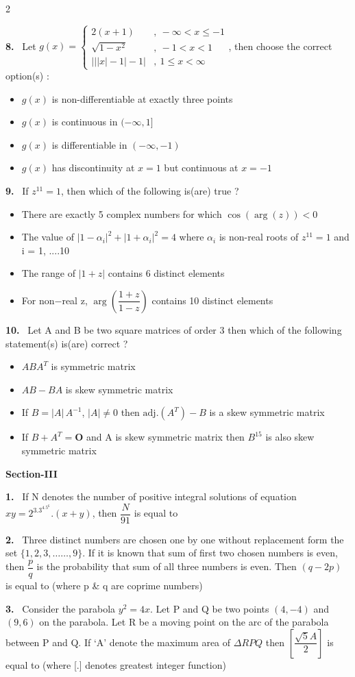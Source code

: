 \documentclass[10pt]{extarticle}
\newcommand{\sect}[1]{\par\smallskip\noindent\textbf{#1}\par}
\newcommand{\qn}[1]{\par\smallskip\noindent\textbf{#1.}~}
\newenvironment{qoptions}{\begin{itemize}[leftmargin=1.8em,itemsep=1pt,topsep=2pt,label={}]}{\end{itemize}}
\newcommand{\opt}[2]{\item[(#1)] #2}
\begin{document}
\begin{multicols}{2}
\qn{8} Let $g(x)=\begin{cases}2(x+1)&,\ -\infty<x\leqslant-1\\ \sqrt{1-x^2}&,\ -1<x<1\\ \big|\big||x|-1\big|-1\big|&,\ 1\leqslant x<\infty\end{cases}$, then choose the correct option(s) :
\begin{qoptions}
\opt{A}{$g(x)$ is non-differentiable at exactly three points}
\opt{B}{$g(x)$ is continuous in $(-\infty,1]$}
\opt{C}{$g(x)$ is differentiable in $(-\infty,-1)$}
\opt{D}{$g(x)$ has discontinuity at $x=1$ but continuous at $x=-1$}
\end{qoptions}

\qn{9} If $z^{11}=1$, then which of the following is(are) true ?
\begin{qoptions}
\opt{A}{There are exactly 5 complex numbers for which $\cos(\arg(z))<0$}
\opt{B}{The value of $|1-\alpha_i|^2+|1+\alpha_i|^2=4$ where $\alpha_i$ is non-real roots of $z^{11}=1$ and i = 1, ....10}
\opt{C}{The range of $|1+z|$ contains 6 distinct elements}
\opt{D}{For non$-$real z, $\arg\left(\dfrac{1+z}{1-z}\right)$ contains 10 distinct elements}
\end{qoptions}

\qn{10} Let A and B be two square matrices of order 3 then which of the following statement(s) is(are) correct ?
\begin{qoptions}
\opt{A}{$ABA^T$ is symmetric matrix}
\opt{B}{$AB-BA$ is skew symmetric matrix}
\opt{C}{If $B=|A|\,A^{-1}$, $|A|\neq0$ then $\text{adj.}(A^T)-B$ is a skew symmetric matrix}
\opt{D}{If $B+A^T=\mathbf O$ and A is skew symmetric matrix then $B^{15}$ is also skew symmetric matrix}
\end{qoptions}

\sect{Section-III}

\qn{1} If N denotes the number of positive integral solutions of equation $xy=2^3.3^4.5^6.(x+y)$, then $\dfrac N{91}$ is equal to

\qn{2} Three distinct numbers are chosen one by one without replacement form the set $\{1,2,3,\dots\dots,9\}$. If it is known that sum of first two chosen numbers is even, then $\dfrac pq$ is the probability that sum of all three numbers is even. Then $(q-2p)$ is equal to (where p \& q are coprime numbers)

\qn{3} Consider the parabola $y^2=4x$. Let P and Q be two points $(4,-4)$ and $(9,6)$ on the parabola. Let R be a moving point on the arc of the parabola between P and Q. If `A' denote the maximum area of $\Delta RPQ$ then $\left[\dfrac{\sqrt5A}{2}\right]$ is equal to (where [.] denotes greatest integer function)


\end{multicols}
\end{document}
